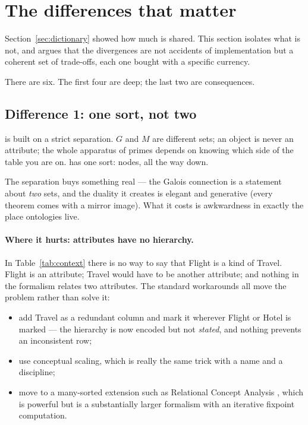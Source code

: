 \section{The differences that matter}
\label{sec:differences}

Section~\ref{sec:dictionary} showed how much is shared. This section isolates
what is not, and argues that the divergences are not accidents of
implementation but a coherent set of trade-offs, each one bought with a
specific currency.

There are six. The first four are deep; the last two are consequences.

\subsection{Difference 1: one sort, not two}
\label{sec:one-sorted}

\fca{} is built on a strict separation. $G$ and $M$ are different sets; an
object is never an attribute; the whole apparatus of primes depends on knowing
which side of the table you are on. \odag{} has one sort: nodes, all the way
down.

The separation buys \fca{} something real --- the Galois connection is a
statement about \emph{two} sets, and the duality it creates is elegant and
generative (every theorem comes with a mirror image). What it costs is
awkwardness in exactly the place ontologies live.

\paragraph{Where it hurts: attributes have no hierarchy.} In
Table~\ref{tab:context} there is no way to say that \textsf{Flight} is a kind
of \textsf{Travel}. \textsf{Flight} is an attribute; \textsf{Travel} would
have to be another attribute; and nothing in the formalism relates two
attributes. The standard workarounds all move the problem rather than solve
it:

\begin{itemize}[leftmargin=1.4em]
\item add \textsf{Travel} as a redundant column and mark it wherever
  \textsf{Flight} or \textsf{Hotel} is marked --- the hierarchy is now encoded
  but not \emph{stated}, and nothing prevents an inconsistent row;
\item use conceptual scaling, which is really the same trick with a name and a
  discipline;
\item move to a many-sorted extension such as Relational Concept Analysis
  \citep{rouanehacene2013}, which is powerful but is a substantially larger
  formalism with an iterative fixpoint computation.
\end{itemize}

